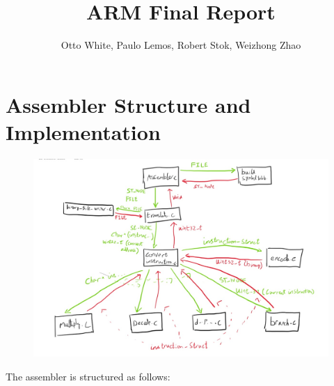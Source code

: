 \documentclass[11pt]{article}
\begin{document}
  \title{ARM Final Report}
  \author{Otto White, Paulo Lemos, Robert Stok, Weizhong Zhao}

  \maketitle

  \section*{Assembler Structure and Implementation}

  \begin{figure}[h]
  \includegraphics[scale=0.3]{assembler_structure}
  \centering
  \end{figure}

The assembler is structured as follows:
\end{document}
